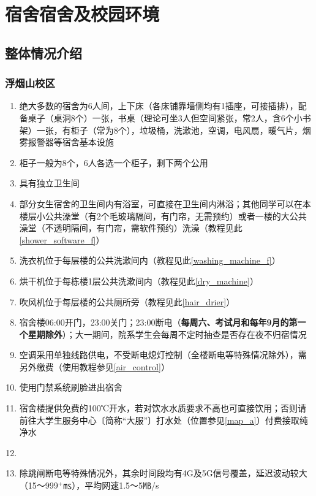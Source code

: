 \chapter[宿舍及校园环境]{宿舍宿舍及校园环境}

\section[整体情况介绍]{整体情况介绍}
\subsection[浮烟山校区]{浮烟山校区}
\begin{enumerate}
      \item 绝大多数的宿舍为6人间，上下床（各床铺靠墙侧均有1插座，可接插排），配备桌子（桌洞8个）一张，书桌（理论可坐3人但空间紧张，常2人，含6个小书架）一张，有柜子（常为8个），垃圾桶，洗漱池，空调，电风扇，暖气片，烟雾报警器等宿舍基本设施
      \item 柜子\footnotemark 一般为8个，6人各选一个柜子，剩下两个公用
      \item 具有独立卫生间
      \item 部分女生宿舍的卫生间内有浴室，可直接在卫生间内淋浴；其他同学可以在本楼层小公共澡堂（有2个毛玻璃隔间，有门帘，无需预约）或者一楼的大公共澡堂（不透明隔间，有门帘，需软件预约）洗澡（教程见此\uline{\ref{shower_software_f}}）
      \item 洗衣机位于每层楼的公共洗漱间内（教程见此\uline{\ref{washing_machine_f}}）
      \item 烘干机位于每栋楼1层公共洗漱间内（教程见此\uline{\ref{dry_machine}}）
      \item 吹风机位于每层楼的公共厕所旁（教程见此\uline{\ref{hair_drier}}）
      \item 宿舍楼06:00开门，23:00关门；23:00断电（\textbf{每周六、考试月和每年9月的第一个星期除外}）；大一期间，院系学生会每周不定时抽查是否存在夜不归宿情况
      \item 空调采用单独线路供电，不受断电熄灯控制（全楼断电等特殊情况除外），需另外缴费（使用教程参见\uline{\ref{air_control}}）
      \item 使用门禁系统刷脸进出宿舍
      \item 宿舍楼提供免费的100℃开水\footnotemark，若对饮水水质要求不高也可直接饮用；否则请前往大学生服务中心〔简称“大服”〕打水处（位置参见\uline{\ref{map_a}}）付费接取纯净水
      \item \textbf{}
      \item 除跳闸断电等特殊情况外，其余时间段均有4G及5G信号覆盖，延迟波动较大（15～999$^+$㎳），平均网速1.5～5㎆/s
\end{enumerate}

